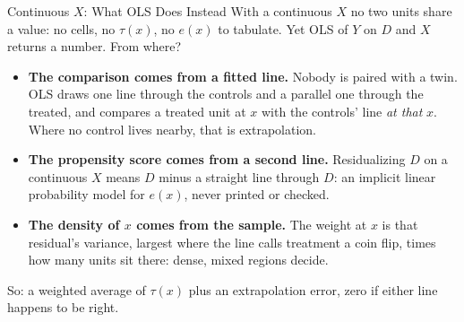 \documentclass[aspectratio=169,11pt,xcolor=dvipsnames]{beamer}
\begin{document}
\begin{frame}{Continuous $X$: What OLS Does Instead}
With a continuous $X$ no two units share a value: no cells, no $\tau(x)$, no
$e(x)$ to tabulate. Yet OLS of $Y$ on $D$ and $X$ returns a number. From where?
\begin{itemize}\itemsep2pt
  \item \textbf{The comparison comes from a fitted line.} Nobody is paired
        with a twin. OLS draws one line through the controls and a parallel
        one through the treated, and compares a treated unit at $x$ with the
        controls' line \emph{at that} $x$. Where no control lives nearby, that
        is extrapolation.
  \item \textbf{The propensity score comes from a second line.} Residualizing
        $D$ on a continuous $X$ means $D$ minus a straight line through $D$: an
        implicit linear probability model for $e(x)$, never printed or checked.
  \item \textbf{The density of $x$ comes from the sample.} The weight at $x$
        is that residual's variance, largest where the line calls treatment a
        coin flip, times how many units sit there: dense, mixed regions decide.
\end{itemize}
\vskip2pt
So: a weighted average of $\tau(x)$ plus an extrapolation error, zero if either
line happens to be right.
\end{frame}
\end{document}
